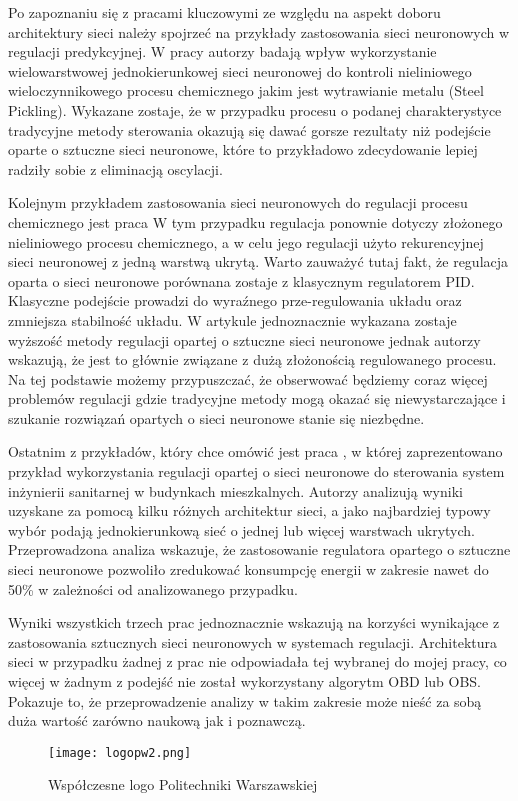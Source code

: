\par Po zapoznaniu się z pracami kluczowymi ze względu na aspekt doboru architektury sieci należy spojrzeć na przykłady zastosowania sieci neuronowych w regulacji predykcyjnej. W pracy \cite{kiti2009} autorzy badają wpływ wykorzystanie wielowarstwowej jednokierunkowej sieci neuronowej do kontroli nieliniowego wieloczynnikowego procesu chemicznego jakim jest wytrawianie metalu (Steel Pickling). Wykazane zostaje, że w przypadku procesu o podanej charakterystyce tradycyjne metody sterowania okazują się dawać gorsze rezultaty niż podejście oparte o sztuczne sieci neuronowe, które to przykładowo zdecydowanie lepiej radziły sobie z eliminacją oscylacji. 
\par Kolejnym przykładem zastosowania sieci neuronowych do regulacji procesu chemicznego jest praca \cite{hosen2011} W tym przypadku regulacja ponownie dotyczy złożonego nieliniowego procesu chemicznego, a w celu jego regulacji użyto rekurencyjnej sieci neuronowej z jedną warstwą ukrytą. Warto zauważyć tutaj fakt, że regulacja oparta o sieci neuronowe porównana zostaje z klasycznym regulatorem PID. Klasyczne podejście prowadzi do wyraźnego prze-regulowania  układu oraz zmniejsza stabilność układu. W artykule jednoznacznie wykazana zostaje wyższość metody regulacji opartej o sztuczne sieci
neuronowe jednak autorzy wskazują, że jest to głównie związane z dużą złożonością regulowanego procesu. Na tej podstawie możemy przypuszczać, że obserwować będziemy coraz więcej problemów regulacji gdzie tradycyjne metody mogą okazać się niewystarczające i szukanie rozwiązań opartych o sieci neuronowe stanie się niezbędne. 
\par Ostatnim z przykładów, który chce omówić jest praca \cite{afram2017}, w której zaprezentowano przykład wykorzystania regulacji opartej o sieci neuronowe do sterowania system inżynierii sanitarnej w budynkach mieszkalnych. Autorzy analizują wyniki uzyskane za pomocą kilku różnych architektur sieci, a jako najbardziej typowy wybór podają jednokierunkową sieć o jednej lub więcej warstwach ukrytych. Przeprowadzona analiza wskazuje, że zastosowanie regulatora opartego o sztuczne sieci neuronowe pozwoliło zredukować konsumpcję energii w zakresie nawet do 50\% w zależności od analizowanego przypadku.

\par Wyniki wszystkich trzech prac jednoznacznie wskazują na korzyści wynikające z zastosowania sztucznych sieci neuronowych w systemach regulacji. Architektura sieci w przypadku żadnej z prac nie odpowiadała tej wybranej do mojej pracy, co więcej w żadnym z podejść nie został wykorzystany algorytm OBD lub OBS. Pokazuje to, że przeprowadzenie analizy w takim zakresie może nieść za sobą duża wartość zarówno naukową jak i poznawczą. 


\begin{figure}[!h]
	\label{fig:nowe-logo-pw}
	\centering \texttt{[image: logopw2.png]}
	\caption{Współczesne logo Politechniki Warszawskiej}
\end{figure}

